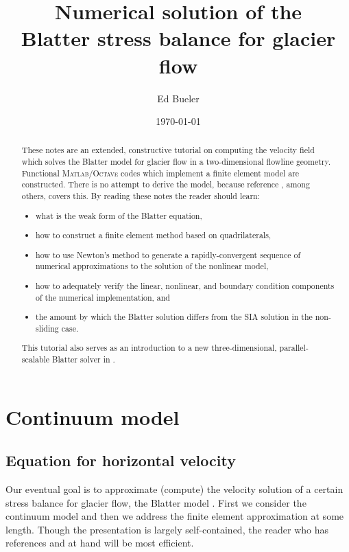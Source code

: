 \documentclass[11pt,final,reqno]{amsart}
\theoremstyle{remark}
\theoremstyle{definition}
\newcommand{\Matlab}{\textsc{Matlab}\xspace}
\newcommand{\Octave}{\textsc{Octave}\xspace}
\begin{document}
\title[Numerical solution of the Blatter stress balance]{Numerical solution of the \\ Blatter stress balance for glacier flow}
\author{Ed Bueler}
\date{\today}

\begin{abstract}
These notes are an extended, constructive tutorial on computing the velocity field which solves the Blatter model for glacier flow \cite{Blatter,ColingeRappaz,Pattyn03} in a two-dimensional flowline geometry.  Functional \Matlab/\Octave codes which implement a finite element model \cite{Elmanetal2005} are constructed.  There is no attempt to derive the model, because reference \cite{SchoofHindmarsh}, among others, covers this.  By reading these notes the reader should learn:
\begin{itemize}
\item what is the weak form of the Blatter equation,
\item how to construct a finite element method based on quadrilaterals,
\item how to use Newton's method to generate a rapidly-convergent sequence of numerical approximations to the solution of the nonlinear model,
\item how to adequately verify the linear, nonlinear, and boundary condition components of the numerical implementation, and
\item the amount by which the Blatter solution differs from the SIA solution in the non-sliding case.
\end{itemize}
This tutorial also serves as an introduction to a new three-dimensional, parallel-scalable Blatter solver in \cite{BrownSmithAhmadia2013}.
\end{abstract}

\maketitle

\setcounter{tocdepth}{1}
\tableofcontents
\vfill


\newpage
\section{Continuum model}\label{sec:continuum}

\subsection*{Equation for horizontal velocity}  Our eventual goal is to approximate (compute) the velocity solution of a certain stress balance for glacier flow, the Blatter model \cite{Blatter,ColingeRappaz,Pattyn03,SchoofCoulombBlatter,SchoofHindmarsh}.  First we consider the continuum model and then we address the finite element approximation at some length.  Though the presentation is largely self-contained, the reader who has references \cite{Elmanetal2005} and \cite{SchoofHindmarsh} at hand will be most efficient.
\end{document}
